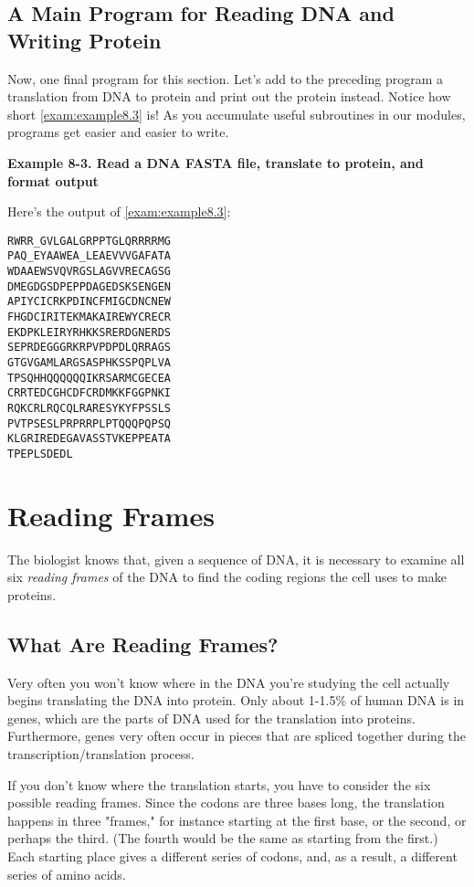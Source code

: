 \subsection{A Main Program for Reading DNA and Writing Protein}
Now, one final program for this section. Let's add to the preceding program a translation from DNA to protein and print out the protein instead. Notice how short \autoref{exam:example8.3} is! As you accumulate useful subroutines in our modules, programs get easier and easier to write. 

\textbf{Example 8-3. Read a DNA FASTA file, translate to protein, and format output}


Here's the output of \autoref{exam:example8.3}:

\begin{lstlisting}
RWRR_GVLGALGRPPTGLQRRRRMG
PAQ_EYAAWEA_LEAEVVVGAFATA
WDAAEWSVQVRGSLAGVVRECAGSG
DMEGDGSDPEPPDAGEDSKSENGEN
APIYCICRKPDINCFMIGCDNCNEW
FHGDCIRITEKMAKAIREWYCRECR
EKDPKLEIRYRHKKSRERDGNERDS
SEPRDEGGGRKRPVPDPDLQRRAGS
GTGVGAMLARGSASPHKSSPQPLVA
TPSQHHQQQQQQIKRSARMCGECEA
CRRTEDCGHCDFCRDMKKFGGPNKI
RQKCRLRQCQLRARESYKYFPSSLS
PVTPSESLPRPRRPLPTQQQPQPSQ
KLGRIREDEGAVASSTVKEPPEATA
TPEPLSDEDL
\end{lstlisting}

\section{Reading Frames}
The biologist knows that, given a sequence of DNA, it is necessary to examine all six \textit{reading frames} of the DNA to find the coding regions the cell uses to make proteins. 

\subsection{What Are Reading Frames?}
Very often you won't know where in the DNA you're studying the cell actually begins translating the DNA into protein. Only about 1-1.5\% of human DNA is in genes, which are the parts of DNA used for the translation into proteins. Furthermore, genes very often occur in pieces that are spliced together during the transcription/translation process.

If you don't know where the translation starts, you have to consider the six possible reading frames. Since the codons are three bases long, the translation happens in three "frames," for instance starting at the first base, or the second, or perhaps the third. (The fourth would be the same as starting from the first.) Each starting place gives a different series of codons, and, as a result, a different series of amino acids.

